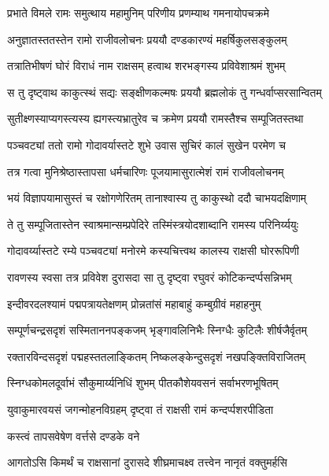 \twolineshloka
{प्रभाते विमले रामः समुत्थाय महामुनिम्}
{परिणीय प्रणम्याथ गमनायोपचक्रमे}%

\twolineshloka
{अनुज्ञातस्ततस्तेन रामो राजीवलोचनः}
{प्रययौ दण्डकारण्यं महर्षिकुलसङ्कुलम्}%

\twolineshloka
{तत्रातिभीषणं घोरं विराधं नाम राक्षसम्}
{हत्वाथ शरभङ्गस्य प्रविवेशाश्रमं शुभम्}%

\twolineshloka
{स तु दृष्ट्वाथ काकुत्स्थं सद्यः सङ्क्षीणकल्मषः}
{प्रययौ ब्रह्मलोकं तु गन्धर्वाप्सरसान्वितम्}%

\twolineshloka
{सुतीक्ष्णस्याप्यगस्त्यस्य ह्यगस्त्यभ्रातुरेव च}
{क्रमेण प्रययौ रामस्तैश्च सम्पूजितस्तथा}%

\twolineshloka
{पञ्चवट्यां ततो रामो गोदावर्यास्तटे शुभे}
{उवास सुचिरं कालं सुखेन परमेण च}%

\twolineshloka
{तत्र गत्वा मुनिश्रेष्ठास्तापसा धर्मचारिणः}
{पूजयामासुरात्मेशं रामं राजीवलोचनम्}%

\twolineshloka
{भयं विज्ञापयामासुस्तं च रक्षोगणेरितम्}
{तानाश्वास्य तु काकुस्थो ददौ चाभयदक्षिणाम्}%

\twolineshloka
{ते तु सम्पूजितास्तेन स्वाश्रमान्सम्प्रपेदिरे}
{तस्मिंस्त्रयोदशाब्दानि रामस्य परिनिर्य्ययुः}%

\twolineshloka
{गोदावर्य्यास्तटे रम्ये पञ्चवट्यां मनोरमे}
{कस्यचित्त्वथ कालस्य राक्षसी घोररूपिणी}%

\twolineshloka
{रावणस्य स्वसा तत्र प्रविवेश दुरासदा}
{सा तु दृष्ट्वा रघुवरं कोटिकन्दर्प्पसन्निभम्}%

\twolineshloka
{इन्दीवरदलश्यामं पद्मपत्रायतेक्षणम्}
{प्रोन्नतांसं महाबाहुं कम्बुग्रीवं महाहनुम्}%

\twolineshloka
{सम्पूर्णचन्द्रसदृशं सस्मिताननपङ्कजम्}
{भृङ्गावलिनिभैः स्निग्धैः कुटिलैः शीर्षजैर्वृतम्}%

\twolineshloka
{रक्तारविन्दसदृशं पद्महस्ततलाङ्कितम्}
{निष्कलङ्केन्दुसदृशं नखपङ्क्तिविराजितम्}%

\twolineshloka
{स्निग्धकोमलदूर्वाभं सौकुमार्य्यनिधिं शुभम्}
{पीतकौशेयवसनं सर्वाभरणभूषितम्}%

\twolineshloka
{युवाकुमारवयसं जगन्मोहनविग्रहम्}
{दृष्ट्वा तं राक्षसी रामं कन्दर्प्पशरपीडिता}%


\onelineshloka
{कस्त्वं तापसवेषेण वर्त्तसे दण्डके वने}%

\twolineshloka
{आगतोऽसि किमर्थं च राक्षसानां दुरासदे}
{शीघ्रमाचक्ष्व तत्त्वेन नानृतं वक्तुमर्हसि}%

